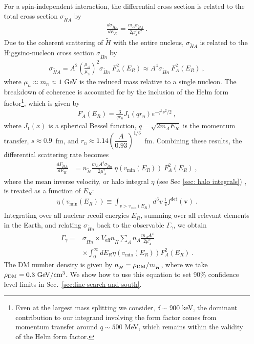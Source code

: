 \documentclass[aps,prd,amsmath,amssymb,10pt,letterpaper,balancelastpage,showpacs,superscriptaddress,nofootinbib,floatfix,notitlepage,longbibliography,twocolumn
]{revtex4-2}
\newcommand{\vbold}{\mathbf{v}}
\newcommand{\Gg}{\Gamma_{\gamma}}
\newcommand{\sxN}{\sigma_{\Ht n}}
\newcommand{\sxA}{\sigma_{\Ht A}}
\newcommand{\GxA}{\Gamma_{\Ht A}}
\newcommand{\Veff}{V_{\text{eff}}}
\newcommand{\nx}{n_{\Ht}}
\newcommand{\vmin}{v_{\text{min}}}
\newcommand{\mx}{m_{\Ht}}
\newcommand{\muA}{\mu_A}
\newcommand{\Ht}{\tilde{H}}
\begin{document}
For a spin-independent interaction, the differential cross section is related to the total cross section $\sxA$ by
\begin{align}
    \frac{d\sxA}{dE_R}=\frac{m_A \sxA}{2\muA^2 v^2} ~.
\end{align}
Due to the coherent scattering of $\Ht$ with the entire nucleus, $\sxA$ is related to the Higgsino-nucleon cross section $\sxN$ by \cite{Barn}
\begin{align}
    \sxA = A^2 \left( \frac{\mu_A}{\mu_n} \right)^2 \sxN  ~F_A^2(E_R)\approx A^4 \sxN~F_A^2(E_R)~,
\end{align}
where $\mu_n \approx m_n \approx 1$ GeV is the reduced mass relative to a single nucleon. The breakdown of coherence is accounted for by the inclusion of the Helm form factor\footnote{Even at the largest mass splitting we consider, $\delta \sim 900$ keV, the dominant contribution to our integrand involving the form factor comes from momentum transfer around $q\sim 500$ MeV, which remains within the validity of the Helm form factor.}, which is given by~\cite{Luminous}
\begin{align} \label{eq: Helm form factor}
    F_A(E_R) = \frac{3}{q r_n} J_1(q r_n) e^{-q^2 s^2/2}~,
\end{align}
where $J_1(x)$ is a spherical Bessel function, $q=\sqrt{2m_A E_R}$ is the momentum transfer, $s \approx 0.9$~fm, and $r_n \approx 1.14 \left(\dfrac{A}{0.93}\right)^{1/3}$~fm. Combining these results, the differential scattering rate becomes
\begin{align}
    \frac{d \GxA}{dE_R}&= \nx \frac{m_A A^4 \sxN}{2\muA^2} ~\eta(\vmin(E_R)) ~F_A^2(E_R) ~,
\end{align}
where the mean inverse velocity, or halo integral $\eta$ (see Sec \ref{sec: halo integrals}) \cite{LMC}, is treated as a function of $E_R$:
\begin{align} \label{eq:halo integral 1}
    \eta(\vmin(E_R)) \equiv \int_{v>\vmin(E_R)} d^3v ~ \frac{1}{v}f^{\text{det}}(\vbold) ~.
\end{align}
Integrating over all nuclear recoil energies $E_R$, summing over all relevant elements in the Earth, and relating $\sxN$ back to the observable $\Gg$, we obtain
\begin{equation} \label{eq:final signal rate}
\begin{split}
    \Gg =& \sxN \times \Veff\nx  \sum_A n_A \frac{m_A A^4 }{2\muA^2}\\
    &\times\int_{0}^{\infty} dE_R \eta(\vmin(E_R)) F_A^2(E_R) ~.
\end{split}
\end{equation}
The DM number density is given by $\nx = \rho_{\rm DM}/\mx$, where we take $\rho_{\rm DM} = 0.3~\text{GeV}/\text{cm}^3$. We show how to use this equation to set 90\% confidence level limits in Sec.~\ref{sec:line search and south}.
\end{document}
